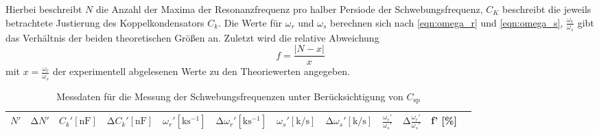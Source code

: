 Hierbei beschreibt $N$ die Anzahl der Maxima der Resonanzfrequenz pro halber Persiode der Schwebungsfrequenz, $C_K$ beschreibt die jeweils betrachtete Justierung des Koppelkondensators $C_k$.
Die Werte für $\omega_r$ und $\omega_s$ berechnen sich nach \eqref{eqn:omega_r} und \eqref{eqn:omega_s}, $\frac{\omega_r}{\omega_s}$ gibt das Verhältnis der beiden theoretischen Größen an.
Zuletzt wird die relative Abweichung
\begin{equation}
f = \frac{\lvert N - x \rvert }{x}
\end{equation}
mit $x = \frac{\omega_r}{\omega_s}$ der experimentell abgelesenen Werte zu den Theoriewerten angegeben.

\begin{table}
  \centering
  \caption{Messdaten für die Messung der Schwebungsfrequenzen unter Berücksichtigung von $C_{\text{sp}}$}
  \label{tab:2}
  \begin{tabular}{c c c c c c c c c c c c}
    \toprule
    {$N'$} & {$\increment N' $} & {$ C_k' [\si{\nano\farad}] $} & {$\increment C_k' [\si{\nano\farad}] $} & {$ \omega_r' [\si{\kilo\second\tothe{-1}}] $} & {$\increment \omega_r' [\si{\kilo\second\tothe{-1}}] $} & {$ \omega_s' [\si{\kilo\per\second}] $} & {$\increment \omega_s' [\si{\kilo\per\second}] $} & {$\frac{\omega_r'}{\omega_s'}_{\text{}}$} & {$\increment \frac{\omega_r'}{\omega_s'}_{\text{}}$} & {f' [\%]} \\
    \midrule
    
    \bottomrule
  \end{tabular}
\end{table}

%
%
%
%
%
%    
%
%
